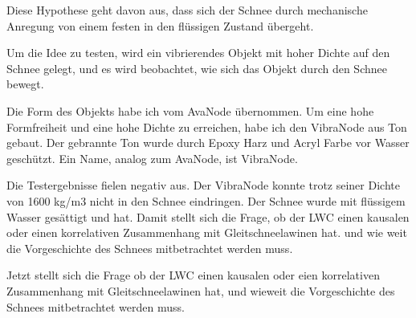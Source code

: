 
Diese Hypothese geht davon aus, dass sich der Schnee durch mechanische Anregung von einem festen in den flüssigen Zustand übergeht.

Um die Idee zu testen, wird ein vibrierendes Objekt mit hoher Dichte auf den Schnee gelegt, und es wird beobachtet, wie sich das Objekt durch den Schnee bewegt.

Die Form des Objekts habe ich vom AvaNode übernommen. Um eine hohe Formfreiheit und eine hohe Dichte zu erreichen, habe ich den VibraNode aus Ton gebaut. Der gebrannte Ton wurde durch Epoxy Harz und Acryl Farbe vor Wasser geschützt. Ein Name, analog zum AvaNode, ist VibraNode.

Die Testergebnisse fielen negativ aus. Der VibraNode konnte trotz seiner Dichte von 1600 kg/m3 nicht in den Schnee eindringen. Der Schnee wurde mit flüssigem Wasser gesättigt und hat.  Damit  stellt sich die Frage, ob der LWC einen kausalen oder einen korrelativen Zusammenhang mit Gleitschneelawinen hat. und wie weit die Vorgeschichte des Schnees mitbetrachtet werden muss.

Jetzt stellt sich die Frage ob der LWC einen kausalen oder eien korrelativen Zusammenhang mit Gleitschneelawinen hat, und wieweit die Vorgeschichte des Schnees mitbetrachtet werden muss. \cite{Altman.2015}

